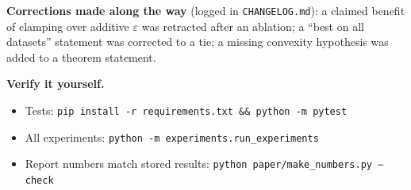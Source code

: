 \documentclass[10pt]{article}
\begin{document}
\textbf{Corrections made along the way} (logged in \texttt{CHANGELOG.md}): a claimed benefit of clamping over additive $\varepsilon$ was retracted after an ablation; a ``best on all datasets'' statement was corrected to a tie; a missing convexity hypothesis was added to a theorem statement.

\textbf{Verify it yourself.}
\begin{itemize}
\item Tests: \texttt{pip install -r requirements.txt \&\& python -m pytest}
\item All experiments: \texttt{python -m experiments.run\_experiments}
\item Report numbers match stored results: \texttt{python paper/make\_numbers.py --check}
\end{itemize}
\end{document}
